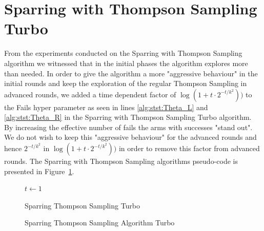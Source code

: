 \documentclass[MSc,beforeExam]{iitcsthesis}
\begin{document}
	\section{Sparring with Thompson Sampling Turbo}
	From the experiments conducted on the Sparring with Thompson Sampling algorithm we witnessed that in the initial phases the algorithm explores more than needed.
	In order to give the algorithm a more "aggressive behaviour" in the initial rounds and keep the exploration of the regular Thompson Sampling in advanced rounds, we added a time dependent factor of $\log(1+t\cdot 2^{-t/k^2}))$ to the Fails hyper parameter as seen in lines \ref{alg:stst:Theta_L} and \ref{alg:stst:Theta_R} in the Sparring with Thompson Sampling Turbo algorithm.
	By increasing the effective number of fails the arms with successes "stand out". We do not wish to keep this "aggressive behaviour" for the advanced rounds and hence $2^{-t/k^2}$ in $\log(1+t\cdot 2^{-t/k^2}))$ in order to remove this factor from advanced rounds.
	The Sparring with Thompson Sampling algorithms pseudo-code is presented in Figure~\ref{alg:SparringTS_turbo}.
	 
	\begin{figure}[h]
	\IncMargin{1em}
		\begin{algorithm}[H]
		
		\BlankLine
		$t\leftarrow 1$\\
			\caption{Sparring Thompson Sampling Turbo}
		\end{algorithm}
		\caption{Sparring Thompson Sampling Algorithm Turbo}\label{alg:SparringTS_turbo}
	\end{figure}
\end{document}
